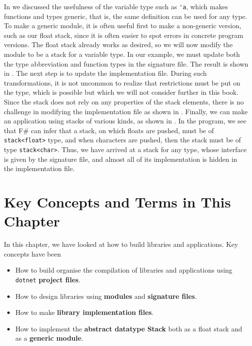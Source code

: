 \documentclass[fsharpNotes.tex]{subfiles}
\begin{document}
In  we discussed the usefulness of the variable type such as \lstinline{'a}, which makes functions and types generic, that is, the same definition can be used for any type. To make a generic module, it is often useful first to make a non-generic version, such as our float stack, since it is often easier to spot errors in concrete program versions. The float stack already works as desired, so we will now modify the module to be a stack for a variable type. In our example, we must update both the type abbreviation and function types in the signature file. The result is shown in .
The next step is to update the implementation file. During such transformations, it is not uncommon to realize that restrictions must be put on the type, which is possible but which we will not consider further in this book. Since the stack does not rely on any properties of the stack elements, there is no challenge in modifying the implementation file as shown in .
Finally, we can make an application using stacks of various kinds, as shown in .
In the program, we see that F\# can infer that a stack, on which floats are pushed, must be of \lstinline{stack<float>} type, and when characters are pushed, then the stack must be of type \lstinline{stack<char>}. Thus, we have arrived at a stack for any type, whose interface is given by the signature file, and almost all of its implementation is hidden in the implementation file.

\section{Key Concepts and Terms in This Chapter}
In this chapter, we have looked at how to build libraries and applications. Key concepts have been
\begin{itemize}
\item How to build organise the compilation of libraries and applications using \lstinline[language=console]{dotnet} \textbf{project files}.
\item How to design libraries using \textbf{modules} and \textbf{signature files}.
\item How to make \textbf{library implementation files}.
\item How to implement the \textbf{abstract datatype Stack} both as a float stack and as a \textbf{generic module}. 
\end{itemize}
\end{document}
